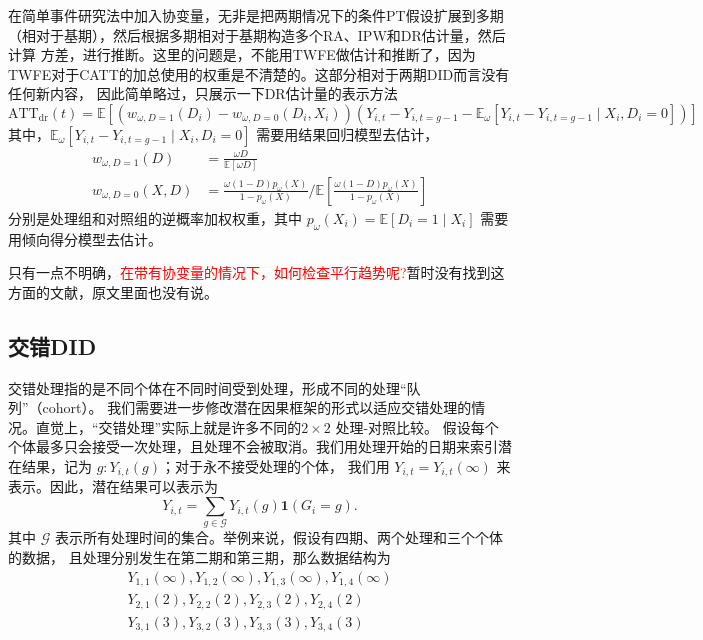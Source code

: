 \documentclass[../didNotes.tex]{subfiles}
\begin{document}
在简单事件研究法中加入协变量，无非是把两期情况下的条件PT假设扩展到多期（相对于基期），然后根据多期相对于基期构造多个RA、IPW和DR估计量，然后计算
方差，进行推断。这里的问题是，不能用TWFE做估计和推断了，因为TWFE对于CATT的加总使用的权重是不清楚的。这部分相对于两期DID而言没有任何新内容，
因此简单略过，只展示一下DR估计量的表示方法
$$
\text{ATT}_{\text{dr}}(t) = \mathbb{E} \left[ \left( w_{\omega,D=1}(D_{i})-w_{\omega,D=0}(D_{i},X_{i})
\right) \left( Y_{i,t}-Y_{i,t=g-1} - \mathbb{E}_{\omega}[Y_{i,t}-Y_{i,t=g-1} \mid X_{i},D_{i}=0] \right) \right]
$$
其中，$\mathbb{E}_{\omega}[Y_{i,t}-Y_{i,t=g-1} \mid X_{i},D_{i}=0]$ 需要用结果回归模型去估计，
\begin{align*}
  w_{\omega,D=1}(D) &= \frac{\omega D}{\mathbb{E}[\omega D]} \\
  w_{\omega ,D=0}(X,D) &=
  \frac{\omega (1-D) p_{\omega}(X)}{1-p_{\omega}(X)} \Big/ \mathbb{E} \left[\frac{\omega
  (1-D) p_{\omega}(X)}{1-p_{\omega}(X)}  \right]
\end{align*}
分别是处理组和对照组的逆概率加权权重，其中 $p_{\omega}(X_i) = \mathbb{E}[D_i=1 \mid X_i]$ 需要用倾向得分模型去估计。

只有一点不明确，\textcolor{red}{在带有协变量的情况下，如何检查平行趋势呢?}暂时没有找到这方面的文献，原文里面也没有说。


\subsection{交错DID}

交错处理指的是不同个体在不同时间受到处理，形成不同的处理``队列''（cohort）。
我们需要进一步修改潜在因果框架的形式以适应交错处理的情况。直觉上，``交错处理''实际上就是许多不同的\( 2 \times 2 \) 处理-对照比较。
假设每个个体最多只会接受一次处理，且处理不会被取消。我们用处理开始的日期来索引潜在结果，记为 \( g: Y_{i,t}(g) \)；对于永不接受处理的个体，
我们用 \( Y_{i,t}=Y_{i,t}(\infty) \) 来表示。因此，潜在结果可以表示为
\[
  Y_{i,t} = \sum_{g \in \mathcal{G}} Y_{i,t}(g) \mathbf{1}(G_{i}=g)
.\]
其中 \( \mathcal{G} \) 表示所有处理时间的集合。举例来说，假设有四期、两个处理和三个个体的数据，
且处理分别发生在第二期和第三期，那么数据结构为
\begin{align*}
  Y_{1,1}(\infty),Y_{1,2}(\infty),Y_{1,3}(\infty),Y_{1,4}(\infty) \\
  Y_{2,1}(2), Y_{2,2}(2), Y_{2,3}(2), Y_{2,4}(2)                  \\
  Y_{3,1}(3), Y_{3,2}(3), Y_{3,3}(3), Y_{3,4}(3)
\end{align*}
\end{document}
